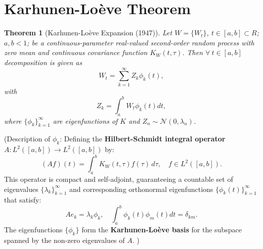 \documentclass[12pt]{report}
\newtheorem{theorem}{Theorem}[section]
\begin{document}
\section{Karhunen-Loève Theorem}
\begin{theorem}[Karhunen-Loève Expansion (1947)] \cite{karatzas}
Let $W= \{W_t\}$, $t \in [a, b] \subset R$; $a, b<1$; be a continuous-parameter real-valued second-order random process with zero
mean and continuous covariance function $K_W(t,\tau)$. Then $\forall \ t\in [a,b]$ decomposition is given as 
\[
W_t = \sum_{k=1}^\infty Z_k \phi_k(t),
\]
with
\[
Z_k = \int_{a}^b W_t\phi_k (t)dt,
\]
where \( \{\phi_k\}_{k=1}^{\infty}\) are eigenfunctions of \(K\) and \(Z_n \sim \mathcal{N}(0, \lambda_n)\).
\end{theorem}
(Description of $\phi_k$: Defining the \textbf{Hilbert-Schmidt integral operator} \(A: L^2([a, b]) \to L^2([a, b])\) by:  
\[
(Af)(t) = \int_a^b K_W(t, \tau) f(\tau) \, d\tau, \quad f \in L^2([a, b]).
\]  
This operator is compact and self-adjoint, guaranteeing a countable set of eigenvalues \(\{\lambda_k\}_{k=1}^\infty\) and corresponding orthonormal eigenfunctions \(\{\phi_k(t)\}_{k=1}^\infty\) that satisfy:  
\[
A e_k = \lambda_k \phi_k, \quad \int_a^b \phi_k(t) \phi_m(t) dt = \delta_{km}.
\]  
The eigenfunctions \(\{\phi_k\}\) form the \textbf{Karhunen-Loève basis} for the subspace spanned by the non-zero eigenvalues of \(A\).
 )
\end{document}
